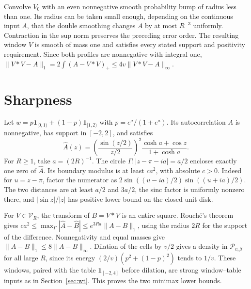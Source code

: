 \documentclass[11pt]{article}
\newcommand{\cV}{\mathcal V}
\newcommand{\cP}{\mathcal P}
\newcommand{\ind}{\mathbf 1}
\begin{document}
Convolve \(V_0\) with an even nonnegative smooth probability bump of radius less than one. Its radius can be taken small enough, depending on the continuous input \(A\), that the double smoothing changes \(A\) by at most \(R^{-3}\) uniformly. Contraction in the sup norm preserves the preceding error order. The resulting window \(V\) is smooth of mass one and satisfies every stated support and positivity requirement. Since both profiles are nonnegative with integral one, \(\|V*V-A\|_1=2\int(A-V*V)_+\le4v\|V*V-A\|_\infty\).


\section{Sharpness}\label{sec:sharp}
Let \(w=p\ind_{[0,1)}+(1-p)\ind_{[1,2)}\) with \(p=e^a/(1+e^a)\). Its autocorrelation \(A\) is nonnegative, has support in \([-2,2]\), and satisfies
\[
  \widehat A(z)=\left(\frac{\sin(z/2)}{z/2}\right)^2
                      \frac{\cosh a+\cos z}{1+\cosh a}.
\]
For \(R\ge1\), take \(a=(2R)^{-1}\). The circle \(\Gamma:|z-\pi-ia|=a/2\) encloses exactly one zero of \(\widehat A\). Its boundary modulus is at least \(c a^2\), with absolute \(c>0\). Indeed for \(u=z-\pi\), factor the numerator as \(2\sin((u-ia)/2)\sin((u+ia)/2)\). The two distances are at least \(a/2\) and \(3a/2\), the sinc factor is uniformly nonzero there, and \(|\sin z|/|z|\) has positive lower bound on the closed unit disk.

For \(V\in\cV_R\), the transform of \(B=V*V\) is an entire square. Rouché's theorem gives \(ca^2\le\max_{\Gamma}|\widehat A-\widehat B|\le e^{3Ra}\|A-B\|_1\), using the radius \(2R\) for the support of the difference. Nonnegativity and equal masses give \(\|A-B\|_1\le8\|A-B\|_\infty\). Dilation of the cells by \(v/2\) gives a density in \(\cP_{v,\beta}\) for all large \(R\), since its energy \((2/v)(p^2+(1-p)^2)\) tends to \(1/v\). These windows, paired with the table $\ind_{[-2,4]}$ before dilation, are strong window--table inputs as in Section~\ref{sec:wt}. This proves the two minimax lower bounds.
\end{document}
